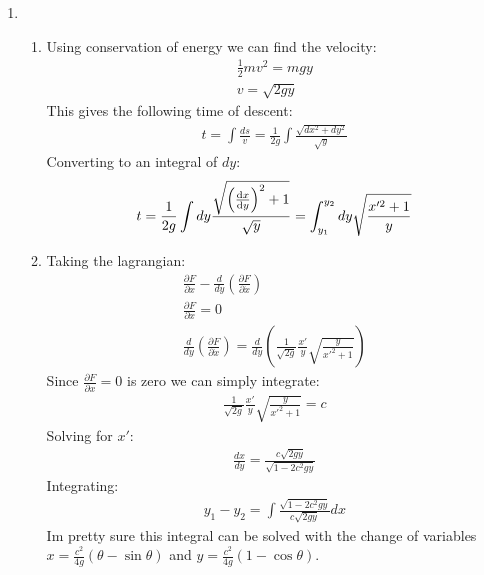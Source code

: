 \documentclass[12pt]{article}
\title{}
\author{Johannes Byle}
\newcommand{\p}[2]{\frac{\partial #1}{\partial #2}}
\newcommand{\der}[2]{\frac{d #1}{d #2}}
\begin{document}
    \maketitle
    \begin{enumerate}
        \item
        \begin{enumerate}
            \item Using conservation of energy we can find the velocity:
            \begin{gather*}
                \frac{1}{2}mv^2=mgy\\
                v=\sqrt{2gy}
            \end{gather*}
            This gives the following time of descent:
            \begin{gather*}
                t=\int \frac{ds}{v}=\frac{1}{2g}\int \frac{\sqrt{dx^2+dy^2}}{\sqrt{y}}
            \end{gather*}
            Converting to an integral of $dy$:
            \begin{gather*}
                t=\frac{1}{2g}\int dy\frac{\sqrt{\left(\dv{x}{y}\right)^2+1}}{\sqrt{y}}=\int_{y_1}^{y_2}dy\sqrt{\frac{x'^2+1}{y}}
            \end{gather*}
            \item Taking the lagrangian:
            \begin{gather*}
                \p{F}{x}-\der{}{y}\left( \p{F}{\dot{x}} \right)\\
                \p{F}{x}=0\\
                \der{}{y}\left( \p{F}{\dot{x}} \right)=\der{}{y}\left(\frac{1}{\sqrt{2g}}\frac{x'}{y}\sqrt{\frac{y}{x'^2+1}}\right)
            \end{gather*}
            Since $\p{F}{x}=0$ is zero we can simply integrate:
            \begin{gather*}
                \frac{1}{\sqrt{2g}}\frac{x'}{y}\sqrt{\frac{y}{x'^2+1}}=c
            \end{gather*}
            Solving for $x'$:
            \begin{gather*}
                \der{x}{y}=\frac{c\sqrt{2gy}}{\sqrt{1-2c^2 gy}}
            \end{gather*}
            Integrating:
            \begin{gather*}
                y_1-y_2=\int \frac{\sqrt{1-2c^2 gy}}{c\sqrt{2gy}}dx
            \end{gather*}
            Im pretty sure this integral can be solved with the change of variables $x=\frac{c^2}{4g}(\theta-\sin\theta)$ and $y=\frac{c^2}{4g}\left( 1-\cos\theta \right)$.

\end{enumerate}
\end{enumerate}
\end{document}
